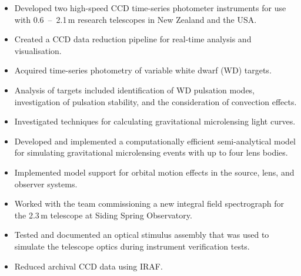 \documentclass[print]{cv-style}
\begin{document}
\begin{entrylist}
  {
\begin{itemize}
    \item Developed two high-speed CCD time-series photometer instruments for use with \mbox{0.6~--~2.1\,m} research telescopes in New Zealand and the USA.
    \item Created a CCD data reduction pipeline for real-time analysis and visualisation.
    \item Acquired time-series photometry of variable white dwarf (WD) targets.
    \item Analysis of targets included identification of WD pulsation modes, investigation of pulsation stability, and the consideration of convection effects.
\end{itemize}}
  {
\begin{itemize}
    \item Investigated techniques for calculating gravitational microlensing light curves.
    \item Developed and implemented a computationally efficient semi-analytical model for simulating gravitational microlensing events with up to four lens bodies.
    \item Implemented model support for orbital motion effects in the source, lens, and observer systems.
  \end{itemize}}
  {
\begin{itemize}
    \item Worked with the team commissioning a new integral field spectrograph for the 2.3\,m telescope at Siding Spring Observatory.
    \item Tested and documented an optical stimulus assembly that was used to simulate the telescope optics during instrument verification tests.
    \item Reduced archival CCD data using IRAF.
  \end{itemize}}
\end{entrylist}
\end{document}
